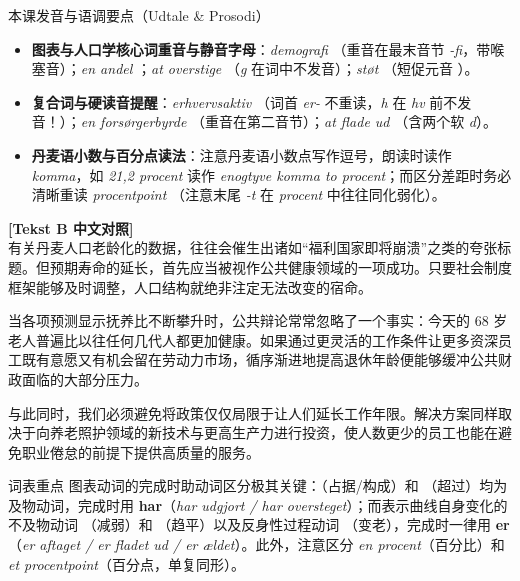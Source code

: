 \begin{tipbox}{本课发音与语调要点（Udtale \& Prosodi）}
\begin{itemize}
  \item \textbf{图表与人口学核心词重音与静音字母}：\textit{demografi} （重音在最末音节 \textit{-fi}，带喉塞音）；\textit{en andel} ；\textit{at overstige} （\textit{g} 在词中不发音）；\textit{støt} （短促元音 ）。
  \item \textbf{复合词与硬读音提醒}：\textit{erhvervsaktiv} （词首 \textit{er-} 不重读，\textit{h} 在 \textit{hv} 前不发音！）；\textit{en forsørgerbyrde} （重音在第二音节）；\textit{at flade ud} （含两个软 \textit{d}）。
  \item \textbf{丹麦语小数与百分点读法}：注意丹麦语小数点写作逗号，朗读时读作 \textit{komma}，如 \textit{21,2 procent} 读作 \textit{enogtyve komma to procent}；而区分差距时务必清晰重读 \textit{procentpoint} （注意末尾 \textit{-t} 在 \textit{procent} 中往往同化弱化）。
\end{itemize}
\end{tipbox}

\begin{transbox}
\small
\textbf{\color{NCDTeal}[Tekst B 中文对照]}\\
有关丹麦人口老龄化的数据，往往会催生出诸如“福利国家即将崩溃”之类的夸张标题。但预期寿命的延长，首先应当被视作公共健康领域的一项成功。只要社会制度框架能够及时调整，人口结构就绝非注定无法改变的宿命。

当各项预测显示抚养比不断攀升时，公共辩论常常忽略了一个事实：今天的 68 岁老人普遍比以往任何几代人都更加健康。如果通过更灵活的工作条件让更多资深员工既有意愿又有机会留在劳动力市场，循序渐进地提高退休年龄便能够缓冲公共财政面临的大部分压力。

与此同时，我们必须避免将政策仅仅局限于让人们延长工作年限。解决方案同样取决于向养老照护领域的新技术与更高生产力进行投资，使人数更少的员工也能在避免职业倦怠的前提下提供高质量的服务。
\end{transbox}


\begin{tipbox}{词表重点}
图表动词的完成时助动词区分极其关键：（占据/构成）和 （超过）均为及物动词，完成时用 \textbf{har}（\textit{har udgjort / har oversteget}）；而表示曲线自身变化的不及物动词 （减弱）和 （趋平）以及反身性过程动词 （变老），完成时一律用 \textbf{er}（\textit{er aftaget / er fladet ud / er ældet}）。此外，注意区分 \textit{en procent}（百分比）和 \textit{et procentpoint}（百分点，单复同形）。
\end{tipbox}

